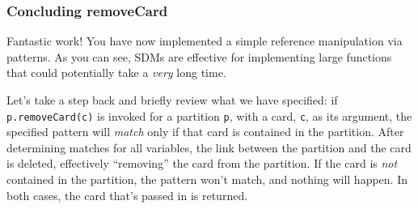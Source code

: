 \newpage
\genHeader
\hypertarget{remCard end}{}
\subsubsection{Concluding removeCard}

Fantastic work! You have now implemented a simple reference manipulation via patterns. As you can see, SDMs are effective for
implementing large functions that could potentially take a \emph{very} long time. 

Let's take a step back and briefly review what we have specified:  if \texttt{p.remove\-Card(c)} is invoked for a partition \texttt{p}, with a card, \texttt{c},
as its argument, the specified pattern will \emph{match} only if that card is contained in the partition. After determining matches for all variables, the
link between the partition and the card is deleted, effectively ``removing'' the card from the partition. If the card is \emph{not} contained in the partition,
the pattern won't match, and nothing will happen. In both cases, the card that's passed in is returned.

